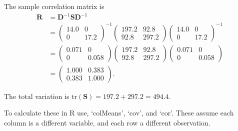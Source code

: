 \documentclass[]{book}
\newenvironment{Shaded}{\begin{snugshade}}{\end{snugshade}}
\newcommand{\DataTypeTok}[1]{\textcolor[rgb]{0.13,0.29,0.53}{#1}}
\newcommand{\DecValTok}[1]{\textcolor[rgb]{0.00,0.00,0.81}{#1}}
\newcommand{\KeywordTok}[1]{\textcolor[rgb]{0.13,0.29,0.53}{\textbf{#1}}}
\newcommand{\NormalTok}[1]{#1}
\newcommand{\OperatorTok}[1]{\textcolor[rgb]{0.81,0.36,0.00}{\textbf{#1}}}
\newcommand{\OtherTok}[1]{\textcolor[rgb]{0.56,0.35,0.01}{#1}}
\newcommand{\StringTok}[1]{\textcolor[rgb]{0.31,0.60,0.02}{#1}}
\theoremstyle{definition}
\theoremstyle{definition}
\theoremstyle{definition}
\theoremstyle{remark}
\begin{document}
The sample correlation matrix is
\begin{align*}
\boldsymbol R&= \boldsymbol D^{-1} \boldsymbol S\boldsymbol D^{-1}\\
&= \begin{pmatrix} 14.0 & 0 \\ 0 & 17.2 \end{pmatrix}^{-1} \begin{pmatrix} 197.2 & 92.8 \\ 92.8 & 297.2 \end{pmatrix} \begin{pmatrix} 14.0 & 0 \\ 0 & 17.2 \end{pmatrix}^{-1} \\
&= \begin{pmatrix} 0.071 & 0 \\ 0 & 0.058 \end{pmatrix} \begin{pmatrix} 197.2 & 92.8 \\ 92.8 & 297.2 \end{pmatrix} \begin{pmatrix} 0.071 & 0 \\ 0 & 0.058 \end{pmatrix} \\
&= \begin{pmatrix} 1.000 & 0.383 \\ 0.383 & 1.000 \end{pmatrix}.
\end{align*}

The total variation is \(\text{tr}(\boldsymbol S) = 197.2 + 297.2 = 494.4\).

To calculate these in R use, `colMeans', `cov', and `cor'. These assume each column is a different variable, and each row a different observation.

\begin{Shaded}
\end{Shaded}
\end{document}
